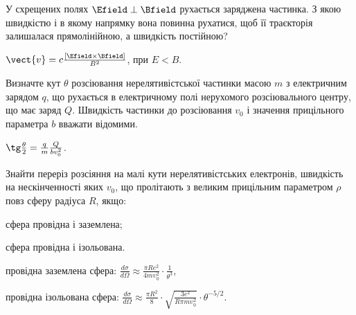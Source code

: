 \begin{problem}%
У схрещених полях $\Efield\perp\Bfield$ рухається заряджена частинка. З якою швидкістю і в якому напрямку вона повинна рухатися, щоб її траєкторія залишалася прямолінійною, а швидкість постійною?
\begin{solution}
	$\vect{v} = c \frac{\left[ \Efield\times\Bfield\right] }{B^2}$, при $E<B$.
\end{solution}
\end{problem}

\begin{problem}
Визначте кут $\theta$ розсіювання нерелятивістської частинки масою $m$ з електричним зарядом $q$, що рухається в електричному полі нерухомого розсіювального центру, що має заряд $Q$. Швидкість частинки до розсіювання $v_0$ і значення прицільного параметра $b$ вважати відомими.
\begin{solution}
	$\tg\frac{\theta}{2} = \frac qm \frac{Q}{bv_0^2}$.
\end{solution}
\end{problem}

\begin{problem}
Знайти переріз розсіяння на малі кути нерелятивістських електронів, швидкість на нескінченності яких $v_0$, що пролітають з великим прицільним параметром $\rho$ повз сферу радіуса $R$, якщо:
\begin{enumerate*}[label=\alph*)]
	\item сфера провідна і заземлена;
	\item сфера провідна і ізольована.
\end{enumerate*}

\begin{solution}
	\begin{enumerate*}[label=\alph*)]
		\item провідна заземлена сфера: $\frac{d\sigma}{d\Omega} \approx \frac{\pi Re^2}{4mυ_0^2} \cdot \frac{1}{\theta ^3}$,
		\item провідна ізольована сфера: $\frac{d\sigma}{d\Omega} \approx \frac{\pi R^2}{8} \cdot \sqrt {\frac{3e^2}{R\pi mυ_0^2}}\cdot\theta^{-5/2}$.
	\end{enumerate*}
\end{solution}
\end{problem}

